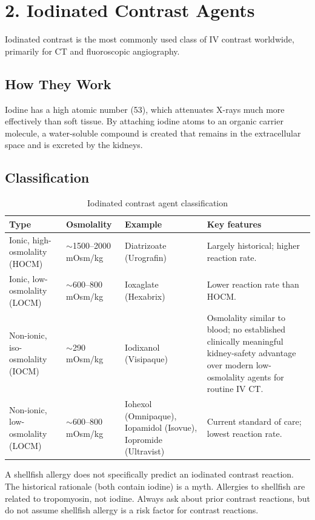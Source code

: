 \section*{2. Iodinated Contrast Agents}
Iodinated contrast is the most commonly used class of IV contrast worldwide, primarily for CT and fluoroscopic angiography.

\subsection*{How They Work}
Iodine has a high atomic number (53), which attenuates X-rays much more effectively than soft tissue. By attaching iodine atoms to an organic carrier molecule, a water-soluble compound is created that remains in the extracellular space and is excreted by the kidneys.

\subsection*{Classification}

\begin{table}[h]
\centering
\caption{Iodinated contrast agent classification}
\begin{tabular}{|p{}|p{}|p{}|p{}|}
\hline
\textbf{Type} & \textbf{Osmolality} & \textbf{Example} & \textbf{Key features} \\
\hline
Ionic, high-osmolality (HOCM) & $\sim$1500--2000 mOsm/kg & Diatrizoate (Urografin) & Largely historical; higher reaction rate. \\
\hline
Ionic, low-osmolality (LOCM) & $\sim$600--800 mOsm/kg & Ioxaglate (Hexabrix) & Lower reaction rate than HOCM. \\
\hline
Non-ionic, iso-osmolality (IOCM) & $\sim$290 mOsm/kg & Iodixanol (Visipaque) & Osmolality similar to blood; no established clinically meaningful kidney-safety advantage over modern low-osmolality agents for routine IV CT. \\
\hline
Non-ionic, low-osmolality (LOCM) & $\sim$600--800 mOsm/kg & Iohexol (Omnipaque), Iopamidol (Isovue), Iopromide (Ultravist) & Current standard of care; lowest reaction rate. \\
\hline
\end{tabular}
\end{table}

\begin{pearlbox}
A shellfish allergy does not specifically predict an iodinated contrast reaction. The historical rationale (both contain iodine) is a myth. Allergies to shellfish are related to tropomyosin, not iodine. Always ask about prior contrast reactions, but do not assume shellfish allergy is a risk factor for contrast reactions.
\end{pearlbox}

